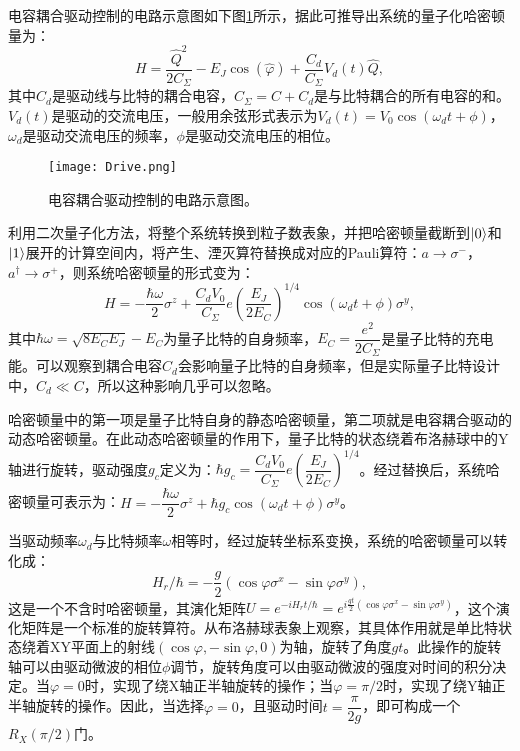 电容耦合驱动控制的电路示意图如下图\ref{fig:drive}所示，据此可推导出系统的量子化哈密顿量为：
\begin{equation}
	H = \dfrac{\hat{Q}^{2}}{2C_{\Sigma}}-E_{J}\cos\left(\hat{\varphi}\right)+\dfrac{C_{d}}{C_{\Sigma}}V_{d}(t)\hat{Q},
\end{equation}
其中$ C_{d}$是驱动线与比特的耦合电容，$ C_{\Sigma}=C+C_{d}$是与比特耦合的所有电容的和。$V_{d}(t)$是驱动的交流电压，一般用余弦形式表示为$ V_{d}(t)=V_{0}\cos(\omega_{d}t+\phi)$，$ \omega_{d}$是驱动交流电压的频率，$ \phi$是驱动交流电压的相位。
\begin{figure}[h]
	\centering
	\texttt{[image: Drive.png]}
	\caption{电容耦合驱动控制的电路示意图。}
	\label{fig:drive}
\end{figure}
利用二次量子化方法，将整个系统转换到粒子数表象，并把哈密顿量截断到$ \left|0\right>$和$ \left|1\right>$展开的计算空间内，将产生、湮灭算符替换成对应的Pauli算符：$ a \rightarrow \sigma^{-}$，$ a^{\dagger} \rightarrow \sigma^{+}$，则系统哈密顿量的形式变为：
\begin{equation}
	H = -\dfrac{\hbar\omega}{2}\sigma^{z}+\dfrac{C_{d}V_{0}}{C_{\Sigma}}{e}(\dfrac{E_{J}}{2E_{C}})^{1/4}\cos(\omega_{d}t+\phi)\sigma^{y},
\end{equation}
其中$ \hbar\omega = \sqrt{8E_{C}E_{J}}-E_{C}$为量子比特的自身频率，$ E_{C} = \dfrac{{e}^{2}}{2C_{\Sigma}}$是量子比特的充电能。可以观察到耦合电容$ C_{d}$会影响量子比特的自身频率，但是实际量子比特设计中，$ C_{d}\ll C$，所以这种影响几乎可以忽略。

哈密顿量中的第一项是量子比特自身的静态哈密顿量，第二项就是电容耦合驱动的动态哈密顿量。在此动态哈密顿量的作用下，量子比特的状态绕着布洛赫球中的Y轴进行旋转，驱动强度$ g_{c}$定义为：$ \hbar g_{c} = \dfrac{C_{d}V_{0}}{C_{\Sigma}}{e}(\dfrac{E_{J}}{2E_{C}})^{1/4}$。经过替换后，系统哈密顿量可表示为：$ H = -\dfrac{\hbar\omega}{2}\sigma^{z}+\hbar g_{c}\cos(\omega_{d}t+\phi)\sigma^{y}$。

当驱动频率$ \omega_{d}$与比特频率$ \omega$相等时，经过旋转坐标系变换\cite{whaley1984rotating}，系统的哈密顿量可以转化成：
\begin{equation}
	H_{r}/\hbar=-\dfrac{g}{2}(\cos\varphi\sigma^{x}-\sin\varphi\sigma^{y}),
\end{equation}
这是一个不含时哈密顿量，其演化矩阵$ U={e}^{-iH_{r}t/\hbar}={e}^{{i}\frac{gt}{2}(\cos\varphi\sigma^{x}-\sin\varphi\sigma^{y})}$，这个演化矩阵是一个标准的旋转算符。从布洛赫球表象上观察，其具体作用就是单比特状态绕着XY平面上的射线$ (\cos\varphi,-\sin\varphi,0)$为轴，旋转了角度$ gt$。此操作的旋转轴可以由驱动微波的相位$ \phi$调节，旋转角度可以由驱动微波的强度对时间的积分决定。当$ \varphi=0$时，实现了绕X轴正半轴旋转的操作；当$ \varphi=\pi/2$时，实现了绕Y轴正半轴旋转的操作。因此，当选择$ \varphi=0$，且驱动时间$t=\dfrac{\pi}{2g}$，即可构成一个$R_X(\pi/2)$门。
